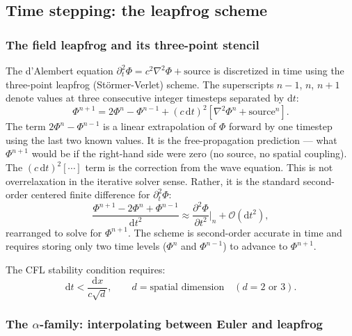 \documentclass[11pt,a4paper]{article}
\newcommand{\order}[1]{\mathcal{O}(#1)}
\newcommand{\dd}{\mathrm{d}}
\begin{document}
\subsection{Time stepping: the leapfrog scheme}
\label{sec:leapfrog}

\subsubsection*{The field leapfrog and its three-point stencil}

The d'Alembert equation $\partial_t^2\Phi = c^2\nabla^2\Phi + \mathrm{source}$ is discretized in time using the three-point leapfrog (Störmer-Verlet) scheme.  The superscripts $n-1$, $n$, $n+1$ denote values at three consecutive integer timesteps separated by $\dd t$:
\begin{equation}
\label{eq:leapfrog_field}
  \Phi^{n+1} = 2\Phi^n - \Phi^{n-1} + (c\,\dd t)^2\!\left[\nabla^2\Phi^n + \mathrm{source}^n\right].
\end{equation}
The term $2\Phi^n - \Phi^{n-1}$ is a linear extrapolation of $\Phi$ forward by one timestep using the last two known values.  It is the free-propagation prediction --- what $\Phi^{n+1}$ would be if the right-hand side were zero (no source, no spatial coupling).  The $(c\,\dd t)^2[\cdots]$ term is the correction from the wave equation.  This is not overrelaxation in the iterative solver sense.  Rather, it is the standard second-order centered finite difference for $\partial_t^2\Phi$:
\begin{equation}
  \frac{\Phi^{n+1} - 2\Phi^n + \Phi^{n-1}}{\dd t^2} \approx \frac{\partial^2\Phi}{\partial t^2}\bigg|_n + \order{\dd t^2},
\end{equation}
rearranged to solve for $\Phi^{n+1}$.  The scheme is second-order accurate in time and requires storing only two time levels ($\Phi^n$ and $\Phi^{n-1}$) to advance to $\Phi^{n+1}$.

The CFL stability condition requires:
\begin{equation}
  \dd t < \frac{\dd x}{c\sqrt{d}}, \qquad d = \text{spatial dimension} \quad (d=2 \text{ or } 3).
\end{equation}

\subsubsection*{The $\alpha$-family: interpolating between Euler and leapfrog}
\end{document}
